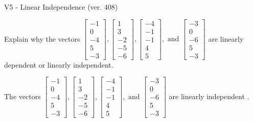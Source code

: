 \begin{exercise}
  \begin{exerciseTitle}V5 - Linear Independence (ver. 408)\end{exerciseTitle}
  \begin{exerciseStatement}
    Explain why the vectors \(\left[\begin{array}{r}
-1 \\
0 \\
-4 \\
5 \\
-3
\end{array}\right] , \left[\begin{array}{r}
1 \\
3 \\
-2 \\
-5 \\
-6
\end{array}\right] , \left[\begin{array}{r}
-4 \\
-1 \\
-1 \\
4 \\
5
\end{array}\right] , \text{ and } \left[\begin{array}{r}
-3 \\
0 \\
-6 \\
5 \\
-3
\end{array}\right]\) are linearly dependent or linearly independent.	


  \end{exerciseStatement}
  \begin{exerciseAnswer}
   The vectors \(\left[\begin{array}{r}
-1 \\
0 \\
-4 \\
5 \\
-3
\end{array}\right] , \left[\begin{array}{r}
1 \\
3 \\
-2 \\
-5 \\
-6
\end{array}\right] , \left[\begin{array}{r}
-4 \\
-1 \\
-1 \\
4 \\
5
\end{array}\right] , \text{ and } \left[\begin{array}{r}
-3 \\
0 \\
-6 \\
5 \\
-3
\end{array}\right]\) are 
  	 linearly independent  .
  


  \end{exerciseAnswer}
\end{exercise}